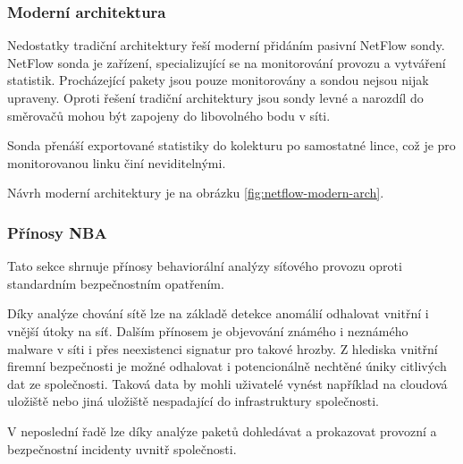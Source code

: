 
\subsubsection*{Moderní architektura}

Nedostatky tradiční architektury řeší moderní přidáním pasivní NetFlow sondy.
NetFlow sonda je zařízení, specializující se na monitorování provozu a vytváření statistik.
Procházející pakety jsou pouze monitorovány a sondou nejsou nijak upraveny.
Oproti řešení tradiční architektury jsou sondy levné a narozdíl do směrovačů mohou být zapojeny do libovolného bodu v síti.

Sonda přenáší exportované statistiky do kolekturu po samostatné lince, což je pro monitorovanou linku činí neviditelnými.

Návrh moderní architektury je na obrázku \ref{fig:netflow-modern-arch}.


\subsubsection*{Přínosy NBA}

Tato sekce shrnuje přínosy behaviorální analýzy síťového provozu oproti standardním bezpečnostním opatřením.

Díky analýze chování sítě lze na základě detekce anomálií odhalovat vnitřní i vnější útoky na síť.
Dalším přínosem je objevování známého i neznámého malware v síti i přes neexistenci signatur pro takové hrozby.
Z hlediska vnitřní firemní bezpečnosti je možné odhalovat i potencionálně nechtěné úniky citlivých dat ze společnosti.
Taková data by mohli uživatelé vynést například na cloudová uložiště nebo jiná uložiště nespadající do infrastruktury společnosti.

V neposlední řadě lze díky analýze paketů dohledávat a prokazovat provozní a bezpečnostní incidenty uvnitř společnosti.
